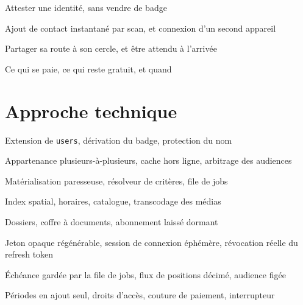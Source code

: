 \documentclass[11pt,a4paper,oneside]{report}
\begin{document}
%
  {Attester une identité, sans vendre de badge}


%
  {Ajout de contact instantané par scan, et connexion d'un second appareil}


%
  {Partager sa route à son cercle, et être attendu à l'arrivée}


%
  {Ce qui se paie, ce qui reste gratuit, et quand}


\part{Approche technique}

%
  {Extension de \texttt{users}, dérivation du badge, protection du nom}


%
  {Appartenance plusieurs-à-plusieurs, cache hors ligne, arbitrage des audiences}


%
  {Matérialisation paresseuse, résolveur de critères, file de jobs}


%
  {Index spatial, horaires, catalogue, transcodage des médias}


%
  {Dossiers, coffre à documents, abonnement laissé dormant}


%
  {Jeton opaque régénérable, session de connexion éphémère, révocation réelle du refresh token}


%
  {Échéance gardée par la file de jobs, flux de positions décimé, audience figée}


%
  {Périodes en ajout seul, droits d'accès, couture de paiement, interrupteur}


\clearpage
{}
\end{document}
